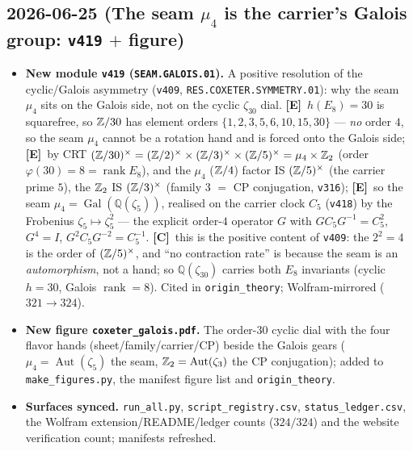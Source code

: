 \documentclass[11pt]{article}
\providecommand{\mE}{\textbf{[E]}}\providecommand{\mC}{\textbf{[C]}}
\providecommand{\vref}[1]{\texttt{#1}}
\begin{document}
\subsection*{2026-06-25 (The seam $\mu_4$ is the carrier's Galois group: \texttt{v419} $+$ figure)}
\begin{itemize}
\item \textbf{New module \texttt{v419} (\texttt{SEAM.GALOIS.01}).} A positive resolution of the
cyclic/Galois asymmetry (\vref{v409}, \texttt{RES.COXETER.SYMMETRY.01}): why the seam $\mu_4$ sits on the
Galois side, not on the cyclic $\zeta_{30}$ dial. \mE\ $h(E_8)=30$ is squarefree, so $\mathbb{Z}/30$ has element
orders $\{1,2,3,5,6,10,15,30\}$ --- \emph{no} order $4$, so the seam $\mu_4$ cannot be a rotation hand and
is forced onto the Galois side; \mE\ by CRT $(\mathbb{Z}/30)^\times=(\mathbb{Z}/2)^\times\times(\mathbb{Z}/3)^\times\times(\mathbb{Z}/5)^\times
=\mu_4\times\mathbb{Z}_2$ (order $\varphi(30)=8=\operatorname{rank}E_8$), and the $\mu_4$ ($\mathbb{Z}/4$) factor IS
$(\mathbb{Z}/5)^\times$ (the
carrier prime $5$), the $\mathbb{Z}_2$ IS $(\mathbb{Z}/3)^\times$ (family $3$ $=$ CP conjugation, \vref{v316}); \mE\ so the
seam $\mu_4=\operatorname{Gal}(\mathbb Q(\zeta_5))$, realised on the carrier clock $C_5$ (\vref{v418}) by the
Frobenius $\zeta_5\mapsto\zeta_5^2$ --- the explicit order-$4$ operator $G$ with $GC_5G^{-1}=C_5^2$, $G^4=I$,
$G^2C_5G^{-2}=C_5^{-1}$. \mC\ this is the positive content of \vref{v409}: the $2^2{=}4$ is the order of
$(\mathbb{Z}/5)^\times$, and ``no contraction rate'' is because the seam is an \emph{automorphism}, not a hand; so
$\mathbb Q(\zeta_{30})$ carries both $E_8$ invariants (cyclic $h{=}30$, Galois $\operatorname{rank}{=}8$).
Cited in \texttt{origin\_theory}; Wolfram-mirrored ($321\to324$).
\item \textbf{New figure \texttt{coxeter\_galois.pdf}.} The order-$30$ cyclic dial with the four flavor
hands (sheet/family/carrier/CP) beside the Galois gears ($\mu_4=\operatorname{Aut}(\zeta_5)$ the seam,
$\mathbb{Z}_2=\operatorname{Aut}(\zeta_3)$ the CP conjugation); added to \texttt{make\_figures.py}, the manifest
figure list and \texttt{origin\_theory}.
\item \textbf{Surfaces synced.} \texttt{run\_all.py}, \texttt{script\_registry.csv},
\texttt{status\_ledger.csv}, the Wolfram extension/README/ledger counts ($324/324$) and the website
verification count; manifests refreshed.
\end{itemize}
\end{document}
